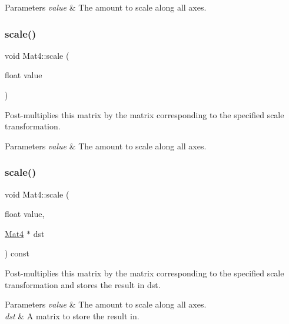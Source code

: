\begin{DoxyParams}{Parameters}
{\em value} & The amount to scale along all axes. \\
\hline
\end{DoxyParams}
\mbox{\label{classMat4_a37c910140d6378e4ef7c7bb1e2d0296d}} 
\subsubsection{\texorpdfstring{scale()}{scale()}\hspace{0.1cm}{\footnotesize\ttfamily [2/12]}}
{\footnotesize\ttfamily void Mat4\+::scale (\begin{DoxyParamCaption}\item[{float}]{value }\end{DoxyParamCaption})}

Post-\/multiplies this matrix by the matrix corresponding to the specified scale transformation.


\begin{DoxyParams}{Parameters}
{\em value} & The amount to scale along all axes. \\
\hline
\end{DoxyParams}
\mbox{\label{classMat4_a02cadab494f29e01993f8bd137ac3c10}} 
\subsubsection{\texorpdfstring{scale()}{scale()}\hspace{0.1cm}{\footnotesize\ttfamily [3/12]}}
{\footnotesize\ttfamily void Mat4\+::scale (\begin{DoxyParamCaption}\item[{float}]{value,  }\item[{\hyperlink{classMat4}{Mat4} $\ast$}]{dst }\end{DoxyParamCaption}) const}

Post-\/multiplies this matrix by the matrix corresponding to the specified scale transformation and stores the result in dst.


\begin{DoxyParams}{Parameters}
{\em value} & The amount to scale along all axes. \\
\hline
{\em dst} & A matrix to store the result in. \\
\hline
\end{DoxyParams}
\mbox{\label{classMat4_a02cadab494f29e01993f8bd137ac3c10}} 
